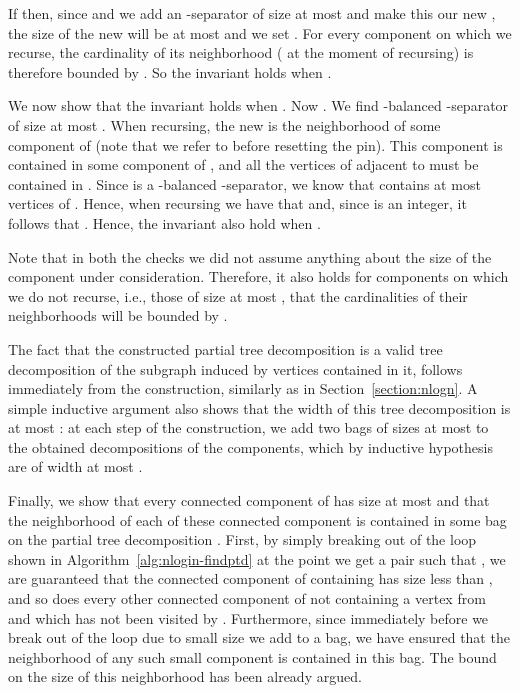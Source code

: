 \documentclass[a4paper,11pt]{article}
\theoremstyle{definition}
\theoremstyle{remark}
\begin{document}
If  then, since  and we add an -separator
of size at most  and make this our new , the size of the new
 will be at most  and we set .  For every
component  on which we recurse, the cardinality of its
neighborhood ( at the moment of recursing) is therefore bounded by
.  So the invariant holds when .

We now show that the invariant holds when .  Now
.  We find -balanced -separator
 of size at most .  When recursing, the new  is the
neighborhood of some component  of  (note that we refer to  before resetting the
pin).  This component is contained in some component  of , and all the vertices of  adjacent to
 must be contained in .  Since  is a
-balanced -separator, we know that  contains
at most  vertices of .  Hence, when
recursing we have that  and, since  is an
integer, it follows that .  Hence, the invariant also
hold when .

Note that in both the checks we did not assume anything about the size
of the component under consideration.  Therefore, it also holds for
components on which we do not recurse, i.e., those of size at most
, that the cardinalities of their neighborhoods will be
bounded by .

The fact that the constructed partial tree decomposition is a valid
tree decomposition of the subgraph induced by vertices contained in
it, follows immediately from the construction, similarly as in
Section~\ref{section:nlogn}.  A simple inductive argument also shows
that the width of this tree decomposition is at most : at each
step of the construction, we add two bags of sizes at most
 to the obtained decompositions of the
components, which by inductive hypothesis are of width at most .

Finally, we show that every connected component of 
has size at most  and that the neighborhood of each of these
connected component is contained in some bag on the partial tree
decomposition .  First, by simply breaking out of the loop shown
in Algorithm~\ref{alg:nlogin-findptd} at the point we get a pair
 such that , we are guaranteed that the
connected component of  containing 
has size less than , and so does every other connected
component of  not containing a vertex from  and which
has not been visited by .  Furthermore, since immediately
before we break out of the loop due to small size we add 
to a bag, we have ensured that the neighborhood of any such small
component is contained in this bag.  The bound on the size of this
neighborhood has been already argued.
\end{document}
